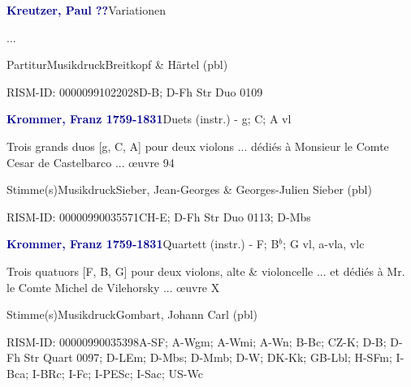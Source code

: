 \documentclass[twocolumn, 12pt]{book}
\begin{document}
\par \vspace{16pt} \textcolor{darkblue}{\textbf{Kreutzer, Paul  ??}}\hfillplus{\textbf{[294]}}\newline Variationen
\par \begin{itshape}...\end{itshape} 
\par \textcolor{darkblue}{}  Partitur\newline Musikdruck\newline Breitkopf \& Härtel  (pbl)
\par RISM-ID: 00000991022028\newline D-B; D-Fh  Str Duo 0109
\par \vspace{16pt} \textcolor{darkblue}{\textbf{Krommer, Franz  1759-1831}}\hfillplus{\textbf{[295]}}\newline Duets (instr.) - g; C; A vl
\par \begin{itshape}Trois grands duos [g, C, A] pour deux violons ... dédiés à Monsieur le Comte Cesar de Castelbarco ... œuvre 94\end{itshape} 
\par \textcolor{darkblue}{}  Stimme(s)\newline Musikdruck\newline Sieber, Jean-Georges \& Georges-Julien Sieber  (pbl)
\par RISM-ID: 00000990035571\newline CH-E; D-Fh  Str Duo 0113; D-Mbs
\par \vspace{16pt} \textcolor{darkblue}{\textbf{Krommer, Franz  1759-1831}}\hfillplus{\textbf{[296]}}\newline Quartett (instr.) - F; B$^b$; G vl, a-vla, vlc
\par \begin{itshape}Trois quatuors [F, B, G] pour deux violons, alte \& violoncelle ... et dédiés à Mr. le Comte Michel de Vilehorsky ... œuvre X\end{itshape} 
\par \textcolor{darkblue}{}  Stimme(s)\newline Musikdruck\newline Gombart, Johann Carl  (pbl)
\par RISM-ID: 00000990035398\newline A-SF; A-Wgm; A-Wmi; A-Wn; B-Bc; CZ-K; D-B; D-Fh  Str Quart 0097; D-LEm; D-Mbs; D-Mmb; D-W; DK-Kk; GB-Lbl; H-SFm; I-Bca; I-BRc; I-Fc; I-PESc; I-Sac; US-Wc
\end{document}
